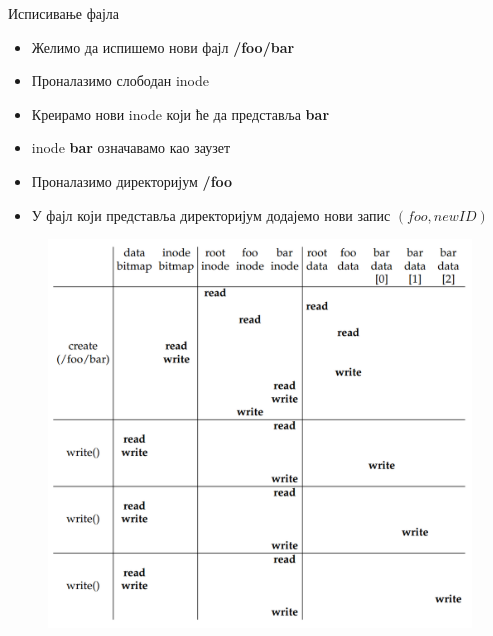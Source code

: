 \documentclass[xcolor=table]{beamer}
\begin{document}
    \begin{frame}[allowframebreaks]{Исписивање фајла}
        \begin{itemize}
            \item Желимо да испишемо нови фајл \textbf{/foo/bar}
            \item Проналазимо слободан inode
            \item Креирамо нови inode који ће да представља \textbf{bar}
            \item inode \textbf{bar} означавамо као заузет
            \item Проналазимо директоријум \textbf{/foo}
            \item У фајл који представља директоријум додајемо нови запис \begin{math}(foo, new ID)\end{math}
        \end{itemize}
        
        \framebreak
        
        \begin{figure}
            \centering
            \includegraphics[width=\textwidth,height=0.8\textheight,keepaspectratio]{images/write.png}
            \label{fig:write.png}
        \end{figure}
    \end{frame}
\end{document}
